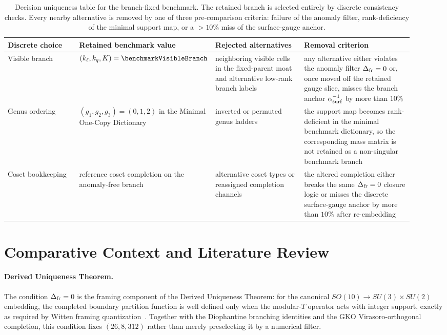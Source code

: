 \documentclass[11pt]{article}
\begin{document}
\begin{table}[t]
\centering
\small
\begin{tabular}{@{}>{\raggedright\arraybackslash}p{0.19\linewidth}>{\raggedright\arraybackslash}p{0.19\linewidth}>{\raggedright\arraybackslash}p{0.24\linewidth}>{\raggedright\arraybackslash}p{0.30\linewidth}@{}}
\hline
Discrete choice & Retained benchmark value & Rejected alternatives & Removal criterion \\
\hline
Visible branch & $(k_{\ell},k_q,K)=\benchmarkVisibleBranch$ & neighboring visible cells in the fixed-parent moat and alternative low-rank branch labels & any alternative either violates the anomaly filter $\Delta_{\rm fr}=0$ or, once moved off the retained gauge slice, misses the branch anchor $\alpha^{-1}_{\rm surf}$ by more than $10\%$ \\

Genus ordering & $(g_1,g_2,g_3)=(0,1,2)$ in the Minimal One-Copy Dictionary & inverted or permuted genus ladders & the support map becomes rank-deficient in the minimal benchmark dictionary, so the corresponding mass matrix is not retained as a non-singular benchmark branch \\

Coset bookkeeping & reference coset completion on the anomaly-free branch & alternative coset types or reassigned completion channels & the altered completion either breaks the same $\Delta_{\rm fr}=0$ closure logic or misses the discrete surface-gauge anchor by more than $10\%$ after re-embedding \\
\hline
\end{tabular}
\caption{Decision uniqueness table for the branch-fixed benchmark. The retained branch is selected entirely by discrete consistency checks. Every nearby alternative is removed by one of three pre-comparison criteria: failure of the anomaly filter, rank-deficiency of the minimal support map, or a $>10\%$ miss of the surface-gauge anchor.}
\label{tab:decision-uniqueness}
\end{table}

\section{Comparative Context and Literature Review}

\paragraph{Derived Uniqueness Theorem.}
The condition $\Delta_{\rm fr}=0$ is the framing component of the Derived Uniqueness Theorem: for the canonical $SO(10)\to SU(3)\times SU(2)$ embedding, the completed boundary partition function is well defined only when the modular-$T$ operator acts with integer support, exactly as required by Witten framing quantization~\cite{witten1989}. Together with the Diophantine branching identities and the GKO Virasoro-orthogonal completion, this condition fixes $(26,8,312)$ rather than merely preselecting it by a numerical filter.
\end{document}
